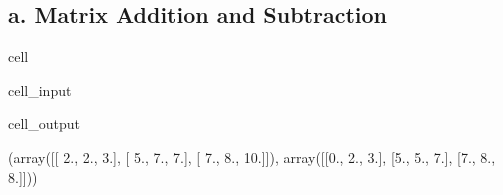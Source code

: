 \documentclass[letterpaper,10pt,english]{jupyterBook}
\begin{document}
\subsection{a. Matrix Addition and Subtraction}
\label{\detokenize{lessons/Intro_to_Matrices_in_NumPy:a-matrix-addition-and-subtraction}}
\begin{sphinxuseclass}{cell}\begin{sphinxVerbatimInput}

\begin{sphinxuseclass}{cell_input}
\begin{sphinxVerbatim}[commandchars=\\\{\}]
    

    

 
\end{sphinxVerbatim}

\end{sphinxuseclass}\end{sphinxVerbatimInput}
\begin{sphinxVerbatimOutput}

\begin{sphinxuseclass}{cell_output}
\begin{sphinxVerbatim}[commandchars=\\\{\}]
(array([[ 2.,  2.,  3.],
        [ 5.,  7.,  7.],
        [ 7.,  8., 10.]]),
 array([[0., 2., 3.],
        [5., 5., 7.],
        [7., 8., 8.]]))
\end{sphinxVerbatim}

\end{sphinxuseclass}\end{sphinxVerbatimOutput}

\end{sphinxuseclass}
\end{document}
